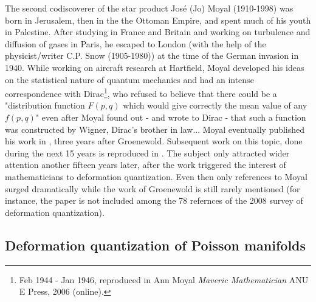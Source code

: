{The second codiscoverer of the star product Jos\'e (Jo) Moyal (1910-1998) was born in Jerusalem, then in the the Ottoman Empire, and spent much of his youth in Palestine. After studying in France and Britain and working on turbulence and diffusion of gases in Paris, he escaped to London (with the help of the physicist/writer C.P. Snow (1905-1980)) at 
the time of the German invasion in 1940. While working on aircraft research at Hartfield, Moyal developed his ideas on the statistical nature of quantum mechanics and had an intense correspondence with Dirac\footnote{Feb 1944 - Jan 1946, reproduced in Ann Moyal {\it Maveric Mathematician} ANU E Press, 2006 (online).}, who refused to believe that there could be a "distribution function $F(p, q)$ which would give correctly the mean value of any $f(p, q)$" even after Moyal found out - and wrote to Dirac - that such a function was constructed by Wigner, Dirac's brother in law... Moyal eventually published his work in \cite{M49}, three years after Groenewold. Subsequent work on this topic, done during the next 15 years is reproduced in \cite{ZFC}. The subject only attracted wider attention another fifteen years later, after the work \cite{BFLS} triggered the interest of mathematicians to deformation quantization. Even then only references to Moyal surged dramatically while the work of Groenewold is still rarely mentioned (for instance, the paper \cite{G46} is not included among the 78 refernces of the 2008 survey \cite{B08} of deformation quantization).}

 \smallskip
 
\subsection{Deformation quantization of Poisson manifolds}

